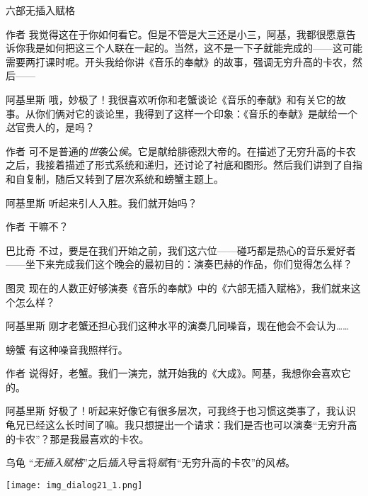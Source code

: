 \begin{dialog}{六部无插入赋格}
\begin{dialogue}
\item[作者]我觉得这在于你如何看它。但是不管是大三还是小三，阿基，我都很愿意告诉你我是如何把这三个人联在一起的。当然，这不是一下子就能完成的——这可能需要两打课时呢。开头我给你讲《音乐的奉献》的故事，强调无穷升高的卡农，然后——

\item[阿基里斯]哦，妙极了！我很喜欢听你和老蟹谈论《音乐的奉献》和有关它的故事。从你们俩对它的谈论里，我得到了这样一个印象：《音乐的奉献》是献给一个\emph{达}官贵人的，是吗？

\item[作者]可不是普通的\emph{世}袭公\emph{侯}。它是献给腓德烈大帝的。在描述了无穷升高的卡农之后，我接着描述了形式系统和递归，还讨论了衬底和图形。然后我们讲到了自指和自复制，随后又转到了层次系统和螃蟹主题上。

\item[阿基里斯]听起来引人入胜。我们就开始吗？

\item[作者]干嘛不？

\item[巴比奇]不过，要是在我们开始之前，我们这六位——碰巧都是热心的音乐爱好者——坐下来完成我们这个晚会的最初目的：演奏巴赫的作品，你们觉得怎么样？

\item[图灵]现在的人数正好够演奏《音乐的奉献》中的《六部无插入赋格》，我们就来这个怎么样？

\item[阿基里斯]刚才老蟹还担心我们这种水平的演奏几同噪音，现在他会不会认为……

\item[螃蟹]有这种噪音我照样行。

\item[作者]说得好，老蟹。我们一演完，就开始我的《大成》。阿基，我想你会喜欢它的。

\item[阿基里斯]好极了！听起来好像它有很多层次，可我终于也习惯这类事了，我认识龟兄已经这么长时间了嘛。我只想提出一个请求：我们是否也可以演奏“无穷升高的卡农”？那是我最喜欢的卡农。

\item[乌龟]“\emph{无插入赋格}”之后\emph{插入}导言将\emph{赋}有“无穷升高的卡农”的风\emph{格}。

\end{dialogue}

\nopagebreak

\begin{center}
\texttt{[image: img\_dialog21\_1.png]}
\end{center}

\end{dialog}
